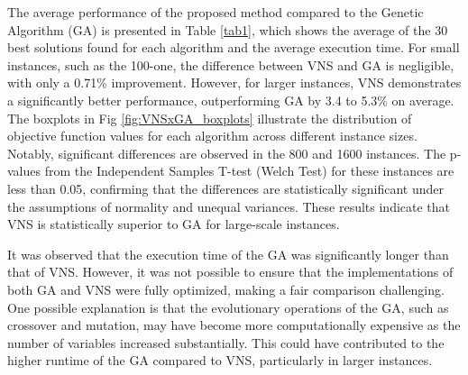 \documentclass[sn-nature]{sn-jnl}%
\theoremstyle{thmstyleone}%
\theoremstyle{thmstyletwo}%
\theoremstyle{thmstylethree}%
\begin{document}
The average performance of the proposed method compared to the Genetic Algorithm (GA) is presented in Table \ref{tab1}, which shows the average of the 30 best solutions found for each algorithm and the average execution time. For small instances, such as the 100-one, the difference between VNS and GA is negligible, with only a 0.71\% improvement. However, for larger instances, VNS demonstrates a significantly better performance, outperforming GA by 3.4 to 5.3\% on average. The boxplots in Fig \ref{fig:VNSxGA_boxplots} illustrate the distribution of objective function values for each algorithm across different instance sizes. Notably, significant differences are observed in the 800 and 1600 instances. The p-values from the Independent Samples T-test (Welch Test) for these instances are less than 0.05, confirming that the differences are statistically significant under the assumptions of normality and unequal variances. These results indicate that VNS is statistically superior to GA for large-scale instances.


It was observed that the execution time of the GA was significantly longer than that of VNS. However, it was not possible to ensure that the implementations of both GA and VNS were fully optimized, making a fair comparison challenging. One possible explanation is that the evolutionary operations of the GA, such as crossover and mutation, may have become more computationally expensive as the number of variables increased substantially. This could have contributed to the higher runtime of the GA compared to VNS, particularly in larger instances.
\end{document}
